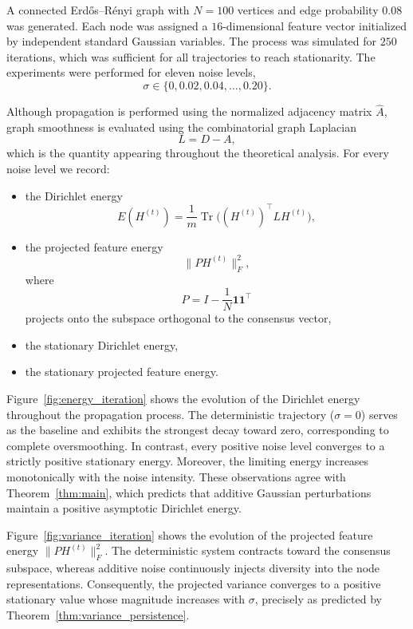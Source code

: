 \documentclass{article}
\begin{document}
A connected Erd\H{o}s--R\'enyi graph with
$N=100$ vertices and edge probability $0.08$
was generated.
Each node was assigned a $16$-dimensional feature vector initialized by
independent standard Gaussian variables.
The process was simulated for $250$ iterations, which was sufficient for
all trajectories to reach stationarity.
The experiments were performed for eleven noise levels,
\[
\sigma
\in
\{
0,0.02,0.04,\ldots,0.20
\}.
\]

Although propagation is performed using the normalized adjacency matrix
$\hat A$, graph smoothness is evaluated using the combinatorial graph
Laplacian
\[
L=D-A,
\]
which is the quantity appearing throughout the theoretical analysis.
For every noise level we record:
\begin{itemize}
	\item the Dirichlet energy
	\[
	E(H^{(t)})
	=
	\frac{1}{m}\operatorname{Tr}\bigl((H^{(t)})^{\top} L H^{(t)}\bigr),
	\]
	
	\item the projected feature energy
	\[
	\|P H^{(t)}\|_F^2,
	\]
	where	
	\[
	P
	=
	I-\frac1N\mathbf1\mathbf1^\top
	\]
	projects onto the subspace orthogonal to the consensus vector,
	
	\item the stationary Dirichlet energy,
	
	\item the stationary projected feature energy.
\end{itemize}

Figure~\ref{fig:energy_iteration}
shows the evolution of the Dirichlet energy throughout the propagation
process.
The deterministic trajectory ($\sigma=0$) serves as the baseline and
exhibits the strongest decay toward zero, corresponding to complete
oversmoothing.
In contrast, every positive noise level converges to a strictly positive
stationary energy.
Moreover, the limiting energy increases monotonically with the noise
intensity.
These observations agree with
Theorem~\ref{thm:main}, which predicts that additive Gaussian
perturbations maintain a positive asymptotic Dirichlet energy.

Figure~\ref{fig:variance_iteration}
shows the evolution of the projected feature energy
$\|P H^{(t)}\|_F^2$.
The deterministic system contracts toward the consensus subspace,
whereas additive noise continuously injects diversity into the node
representations.
Consequently, the projected variance converges to a positive stationary
value whose magnitude increases with $\sigma$, precisely as predicted by
Theorem~\ref{thm:variance_persistence}.
\end{document}
